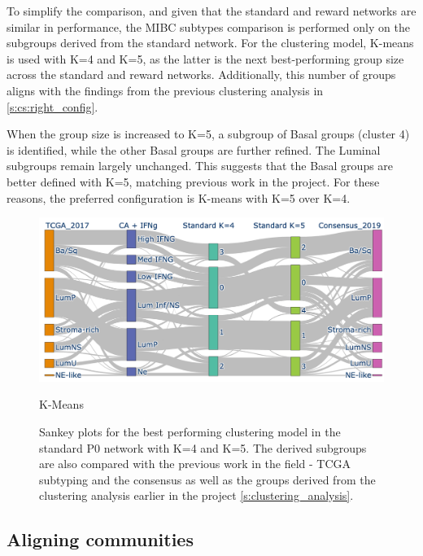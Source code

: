 To simplify the comparison, and given that the standard and reward networks are similar in performance, the MIBC subtypes comparison is performed only on the subgroups derived from the standard network. For the clustering model, K-means is used with K=4 and K=5, as the latter is the next best-performing group size across the standard and reward networks. Additionally, this number of groups aligns with the findings from the previous clustering analysis in \cref{s:cs:right_config}.

When the group size is increased to K=5, a subgroup of Basal groups (cluster 4) is identified, while the other Basal groups are further refined. The Luminal subgroups remain largely unchanged. This suggests that the Basal groups are better defined with K=5, matching previous work in the project. For these reasons, the preferred configuration is K-means with K=5 over K=4.



\begin{figure}[!htb]
    \centering
    \includegraphics[width=\textwidth,keepaspectratio]{Sections/Network_I/Resources/P0/clustering/Sankey_KM_4K_v3.png}
    \caption{K-Means}
    \caption{Sankey plots for the best performing clustering model in the standard P0 network with K=4 and K=5. The derived subgroups are also compared with the previous work in the field - TCGA subtyping \citep{Robertson2017-mg} and the consensus \citet{Kamoun2020-tj} as well as the groups derived from the clustering analysis earlier in the project \cref{s:clustering_analysis}. }
    \label{fig:N_I:p0_sky_KMeans}
\end{figure}





\subsection{Aligning communities} \label{s:ap:align_coms}

